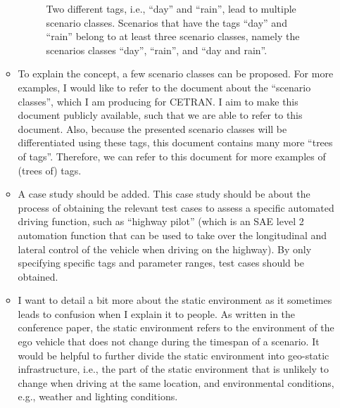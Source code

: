 \documentclass[10pt,final,a4paper,oneside,onecolumn]{article}
\newlength\venncircle\setlength{\venncircle}{10em}
\begin{document}
\begin{itemize}
\begin{itemize}
\begin{figure}
			\caption{Two different tags, i.e., ``day'' and ``rain'', lead to multiple scenario classes. Scenarios that have the tags ``day'' and ``rain'' belong to at least three scenario classes, namely the scenarios classes ``day'', ``rain'', and ``day and rain''.}
			\label{fig:venn diagram scenario class}
		\end{figure}
		\item To explain the concept, a few scenario classes can be proposed. For more examples, I would like to refer to the document about the ``scenario classes'', which I am producing for CETRAN. I aim to make this document publicly available, such that we are able to refer to this document. Also, because the presented scenario classes will be differentiated using these tags, this document contains many more ``trees of tags''. Therefore, we can refer to this document for more examples of (trees of) tags.
		\item A case study should be added. This case study should be about the process of obtaining the relevant test cases to assess a specific automated driving function, such as ``highway pilot'' (which is an SAE level 2 automation function that can be used to take over the longitudinal and lateral control of the vehicle when driving on the highway). By only specifying specific tags and parameter ranges, test cases should be obtained. 
		\item I want to detail a bit more about the static environment as it sometimes leads to confusion when I explain it to people. As written in the conference paper, the static environment refers to the environment of the ego vehicle that does not change during the timespan of a scenario. It would be helpful to further divide the static environment into geo-static infrastructure, i.e., the part of the static environment that is unlikely to change when driving at the same location, and environmental conditions, e.g., weather and lighting conditions.
	\end{itemize}


\end{itemize}
\end{document}
